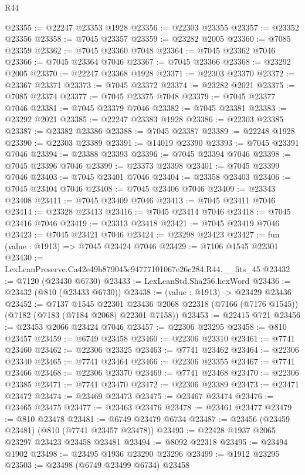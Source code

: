 \begin{lexlean}{R44}
\begin{coremodule}
{@23355 := @22247 @23353 @1928
@23356 := @22303 @23355
@23357 := @23352 @23356
@23358 := @7045 @23357
@23359 := @23282 @2005
@23360 := @7085 @23359
@23362 := @7045 @23360 @7048
@23364 := @7045 @23362 @7046
@23366 := @7045 @23364 @7046
@23367 := @7045 @23366
@23368 := @23292 @2005
@23370 := @22247 @23368 @1928
@23371 := @22303 @23370
@23372 := @23367 @23371
@23373 := @7045 @23372
@23374 := @23282 @2021
@23375 := @7085 @23374
@23377 := @7045 @23375 @7048
@23379 := @7045 @23377 @7046
@23381 := @7045 @23379 @7046
@23382 := @7045 @23381
@23383 := @23292 @2021
@23385 := @22247 @23383 @1928
@23386 := @22303 @23385
@23387 := @23382 @23386
@23388 := @7045 @23387
@23389 := @22248 @1928
@23390 := @22303 @23389
@23391 := @14019 @23390
@23393 := @7045 @23391 @7046
@23394 := @23388 @23393
@23396 := @7045 @23394 @7046
@23398 := @7045 @23396 @7046
@23399 := @23373 @23398
@23401 := @7045 @23399 @7046
@23403 := @7045 @23401 @7046
@23404 := @23358 @23403
@23406 := @7045 @23404 @7046
@23408 := @7045 @23406 @7046
@23409 := @23343 @23408
@23411 := @7045 @23409 @7046
@23413 := @7045 @23411 @7046
@23414 := @23328 @23413
@23416 := @7045 @23414 @7046
@23418 := @7045 @23416 @7046
@23419 := @23313 @23418
@23421 := @7045 @23419 @7046
@23423 := @7045 @23421 @7046
@23424 := @23298 @23423
@23427 := fun (value : @1913) => @7045 @23424 @7046
@23429 := @7106 @1545 @22301
@23430 := LexLeanPreserve.Ca42e49b879045c94777101067e26c284.R44.__fits_45
@23432 := @7120 (@23430 @6730)
@23433 := LexLeanStd.Sha256.hexWord
@23436 := @23432 (@810 (@23433 @6730))
@23438 := (value : @1913) -> @23429 @23436
@23452 := @7137
    @1545
    @22301
    @23436
    @2068
    @22318
    (@7166 (@7176 @1545))
    (@7182 (@7183 (@7184 @2068) @22301 @7158))
@23453 := @22415 @721
@23456 := @23453 @2066 @23424 @7046
@23457 := @22306 @23295
@23458 := @810 @23457
@23459 := @6749 @23458
@23460 := @22306 @23310
@23461 := @7741 @23460
@23462 := @22306 @23325
@23463 := @7741 @23462
@23464 := @22306 @23340
@23465 := @7741 @23464
@23466 := @22306 @23355
@23467 := @7741 @23466
@23468 := @22306 @23370
@23469 := @7741 @23468
@23470 := @22306 @23385
@23471 := @7741 @23470
@23472 := @22306 @23389
@23473 := @23471 @23472
@23474 := @23469 @23473
@23475 := @23467 @23474
@23476 := @23465 @23475
@23477 := @23463 @23476
@23478 := @23461 @23477
@23479 := @810 @23478
@23481 := @6749 @23479 @6734
@23487 := @23456 (@23459 @23481) (@810 (@7741 @23457 @23478))
@23493 := @22428 @1937 @2065 @23297 @23423 @23458 @23481
@23494 := @8092 @22318
@23495 := @23494 @1902
@23498 := @23495 @1936 @23290 @23296
@23499 := @1912 @23295
@23503 := @23498 (@6749 @23499 @6734) @23458
}
\end{coremodule}
\end{lexlean}
